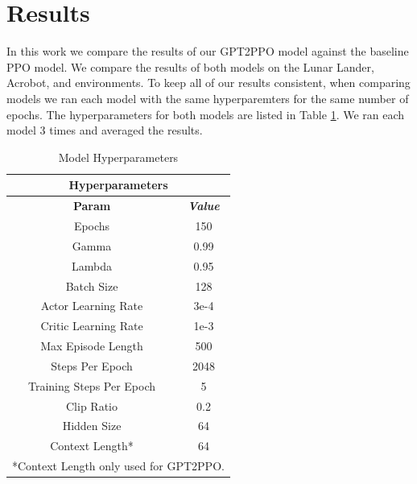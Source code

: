 


\section{Results}
\label{sec:results}

In this work we compare the results of our GPT2PPO model against the baseline PPO model. 
We compare the results of both models on the Lunar Lander, Acrobot, and environments.
To keep all of our results consistent, when comparing models we ran each model with the
same hyperparemters for the same number of epochs.
The hyperparameters for both models are listed in Table \ref{tab:hyperparameters}.
We ran each model 3 times and averaged the results. 

\begin{table}[htbp]
    \caption{Model Hyperparameters}
    \begin{center}
    \begin{tabular}{|c|c|}
    \hline
        \multicolumn{2}{|c|}{\textbf{Hyperparameters}} \\
    \hline
    \textbf{Param} & \textbf{\textit{Value}} \\
    \hline
        Epochs & 150 \\
        Gamma & 0.99 \\
        Lambda & 0.95 \\
        Batch Size & 128 \\
        Actor Learning Rate & 3e-4 \\
        Critic Learning Rate & 1e-3 \\
        Max Episode Length & 500 \\
        Steps Per Epoch & 2048 \\
        Training Steps Per Epoch & 5 \\
        Clip Ratio & 0.2 \\
        Hidden Size & 64 \\
        Context Length* & 64 \\
    \hline
    \multicolumn{2}{l}{*Context Length only used for GPT2PPO.}
    \end{tabular}
    \label{tab:hyperparameters}
    \end{center}
\end{table}

